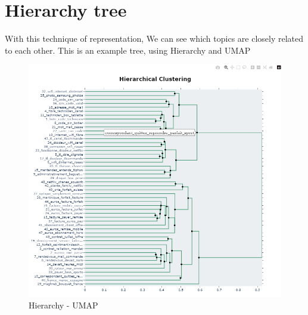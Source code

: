 \section{Hierarchy tree}

With this technique of representation, We can see which topics are closely related to each other. This is an example tree, using Hierarchy and UMAP

\begin{figure}[H]
    \centering
    \includegraphics[width=1\textwidth]{images/results/mini/hierachy_umap_tree.png}
    \caption{Hierarchy - UMAP}
    \label{fig:hierachy_umap}
\end{figure}